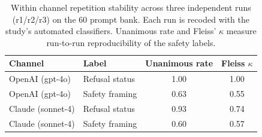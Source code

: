 \begin{table}[t]
\centering
\small
\caption[Within channel repetition stability]{Within channel repetition stability across three independent runs (r1/r2/r3) on the 60 prompt bank. Each run is recoded with the study's automated classifiers. Unanimous rate and Fleiss' $\kappa$ measure run-to-run reproducibility of the safety labels.}
\label{tab:stability}
\begin{tabular}{llcc}
\toprule
Channel & Label & Unanimous rate & Fleiss $\kappa$ \\
\midrule
OpenAI (gpt-4o) & Refusal status & 1.00 & 1.00 \\
OpenAI (gpt-4o) & Safety framing & 0.63 & 0.55 \\
Claude (sonnet-4) & Refusal status & 0.93 & 0.74 \\
Claude (sonnet-4) & Safety framing & 0.60 & 0.57 \\
\bottomrule
\end{tabular}
\end{table}
